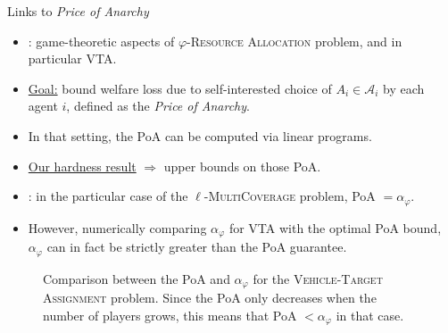 \documentclass{beamer}
\theoremstyle{definition}
\theoremstyle{remark}
\begin{document}
\begin{frame}{Links to \emph{Price of Anarchy}}
  \begin{itemize}
  \item \cite{PM19}: game-theoretic aspects of $\varphi$-\textsc{Resource Allocation} problem, and in particular \textsc{VTA}.
  \item \underline{Goal:} bound welfare loss due to self-interested choice of $A_i \in \mathcal{A}_i$ by each agent $i$, defined as the \emph{Price of Anarchy}.
  \item In that setting, the PoA can be computed via linear programs. 

    \pause
    \bigskip

  \item \underline{Our hardness result} $\Rightarrow$ upper bounds on those PoA.
  \item \cite{CPM19}: in the particular case of the $\ell$-\textsc{MultiCoverage} problem, PoA $=\alpha_{\varphi}$.
  \item However, numerically comparing $\alpha_{\varphi}$ for \textsc{VTA} with the optimal PoA bound,  $\alpha_{\varphi}$ can in fact be strictly greater than the PoA guarantee.
  \end{itemize}
\end{frame}

\begin{frame}
\begin{figure}[!h]
      \begin{center}
    \end{center}
    \caption{Comparison between the PoA and $\alpha_{\varphi}$ for the \textsc{Vehicle-Target Assignment} problem. Since the PoA only decreases when the number of players grows, this means that PoA $< \alpha_{\varphi}$ in that case.}
    \label{fig:VTA}
\end{figure}
\end{frame}
\end{document}
